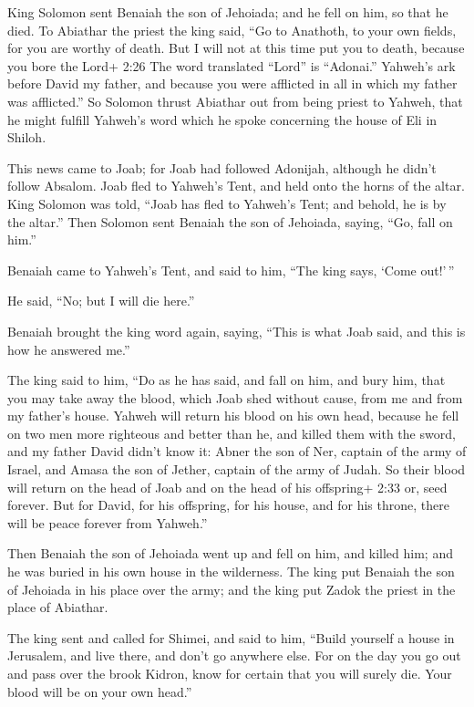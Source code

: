  King Solomon sent Benaiah the son of Jehoiada; and he fell
on him, so that he died.  To Abiathar the priest the king
said, ``Go to Anathoth, to your own fields, for you are worthy of death.
But I will not at this time put you to death, because you bore the Lord+
2:26 The word translated ``Lord'' is ``Adonai.'' Yahweh's ark before
David my father, and because you were afflicted in all in which my
father was afflicted.''  So Solomon thrust Abiathar out
from being priest to Yahweh, that he might fulfill Yahweh's word which
he spoke concerning the house of Eli in Shiloh.

 This news came to Joab; for Joab had followed Adonijah,
although he didn't follow Absalom. Joab fled to Yahweh's Tent, and held
onto the horns of the altar.  King Solomon was told, ``Joab
has fled to Yahweh's Tent; and behold, he is by the altar.'' Then
Solomon sent Benaiah the son of Jehoiada, saying, ``Go, fall on him.''

 Benaiah came to Yahweh's Tent, and said to him, ``The king
says, `Come out!'\,''

He said, ``No; but I will die here.''

Benaiah brought the king word again, saying, ``This is what Joab said,
and this is how he answered me.''

 The king said to him, ``Do as he has said, and fall on
him, and bury him, that you may take away the blood, which Joab shed
without cause, from me and from my father's house.  Yahweh
will return his blood on his own head, because he fell on two men more
righteous and better than he, and killed them with the sword, and my
father David didn't know it: Abner the son of Ner, captain of the army
of Israel, and Amasa the son of Jether, captain of the army of Judah.
 So their blood will return on the head of Joab and on the
head of his offspring+ 2:33 or, seed forever. But for David, for his
offspring, for his house, and for his throne, there will be peace
forever from Yahweh.''

 Then Benaiah the son of Jehoiada went up and fell on him,
and killed him; and he was buried in his own house in the wilderness.
 The king put Benaiah the son of Jehoiada in his place over
the army; and the king put Zadok the priest in the place of Abiathar.

 The king sent and called for Shimei, and said to him,
``Build yourself a house in Jerusalem, and live there, and don't go
anywhere else.  For on the day you go out and pass over the
brook Kidron, know for certain that you will surely die. Your blood will
be on your own head.''

